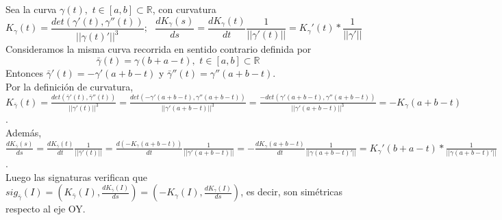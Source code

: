 \documentclass[12pt,a4paper]{article}
\begin{document}
\begin{enumerate}
  Sea la curva $\gamma(t),\,\, t\in[a,b]\subset\mathbb{R}$, con curvatura
  $$K_{\gamma}(t)=\frac{det(\gamma'(t), \gamma''(t))}{||\gamma(t)'||^{3}};\,\,\,\,
  \frac{dK_{\gamma}(s)}{ds} = \frac{dK_{\gamma}(t)}{dt}
  \frac{1}{||\gamma'(t)||} = K_{\gamma}'(t) * \frac{1}{||\gamma'||} $$
  Consideramos la misma curva recorrida en sentido contrario definida por
  $$\bar{\gamma}(t) = \gamma(b+a-t),\,\, t\in[a,b]\subset\mathbb{R}$$
  Entonces $\bar{\gamma}'(t)=-\gamma'(a+b-t)$ y
  $\bar{\gamma}''(t) = \gamma''(a+b-t)$.\\ Por la definición de curvatura,
  $K_{\bar{\gamma}}(t) = \frac{det(\bar{\gamma}'(t),
    \bar{\gamma}''(t))}{||\gamma'(t)||^{3}} = \frac{det(-\gamma'(a+b-t),
    \gamma''(a+b-t))}{||\gamma'(a+b-t)||^{3}} = \frac{- det(\gamma'(a+b-t),
    \gamma''(a+b-t))}{||\gamma'(a+b-t)||^{3}} = -K_{\gamma}(a+b-t)$.\\
  Además,
  $\frac{dK_{\bar{\gamma}}(s)}{ds} = \frac{dK_{\bar{\gamma}}(t)}{dt}
  \frac{1}{||\bar{\gamma}'(t)||} = \frac{d(-K_{\gamma}(a+b-t))}{dt}
  \frac{1}{||\gamma'(a+b-t)||} = -\frac{dK_{\gamma}(a+b-t)}{dt}
  \frac{1}{||\gamma(a+b-t)'||} = K_{\gamma}'(b+a-t) *
  \frac{1}{||\gamma(a+b-t)'||}$.\\

  Luego las signaturas verifican que $sig_{\bar{\gamma}}(I) = (K_{\bar{\gamma}}(I),
  \frac{dK_{\bar{\gamma}}(I)}{ds}) = (- K_{\gamma}(I),
  \frac{dK_{\gamma}(I)}{ds})$, es decir, son simétricas respecto
  al eje OY.
\end{enumerate}
\end{document}
